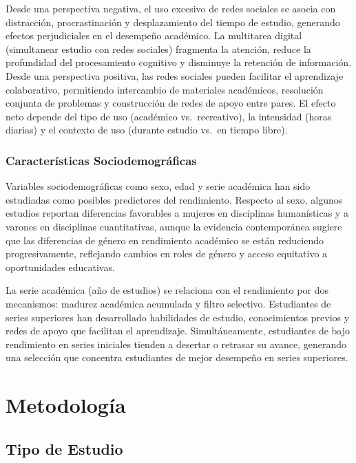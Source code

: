 \documentclass[
  stu,
  floatsintext,
  longtable,
  a4paper,
  nolmodern,
  notxfonts,
  notimes,
  12pt,
  colorlinks=true,linkcolor=blue,citecolor=blue,urlcolor=blue]{apa7}
\begin{document}
Desde una perspectiva negativa, el uso excesivo de redes sociales se
asocia con distracción, procrastinación y desplazamiento del tiempo de
estudio, generando efectos perjudiciales en el desempeño académico. La
multitarea digital (simultanear estudio con redes sociales) fragmenta la
atención, reduce la profundidad del procesamiento cognitivo y disminuye
la retención de información. Desde una perspectiva positiva, las redes
sociales pueden facilitar el aprendizaje colaborativo, permitiendo
intercambio de materiales académicos, resolución conjunta de problemas y
construcción de redes de apoyo entre pares. El efecto neto depende del
tipo de uso (académico vs.~recreativo), la intensidad (horas diarias) y
el contexto de uso (durante estudio vs.~en tiempo libre).

\subsubsection{Características
Sociodemográficas}\label{caracteruxedsticas-sociodemogruxe1ficas}

Variables sociodemográficas como sexo, edad y serie académica han sido
estudiadas como posibles predictores del rendimiento. Respecto al sexo,
algunos estudios reportan diferencias favorables a mujeres en
disciplinas humanísticas y a varones en disciplinas cuantitativas,
aunque la evidencia contemporánea sugiere que las diferencias de género
en rendimiento académico se están reduciendo progresivamente, reflejando
cambios en roles de género y acceso equitativo a oportunidades
educativas.

La serie académica (año de estudios) se relaciona con el rendimiento por
dos mecanismos: madurez académica acumulada y filtro selectivo.
Estudiantes de series superiores han desarrollado habilidades de
estudio, conocimientos previos y redes de apoyo que facilitan el
aprendizaje. Simultáneamente, estudiantes de bajo rendimiento en series
iniciales tienden a desertar o retrasar su avance, generando una
selección que concentra estudiantes de mejor desempeño en series
superiores.

\section{Metodología}\label{metodologuxeda}

\subsection{Tipo de Estudio}\label{tipo-de-estudio}
\end{document}
